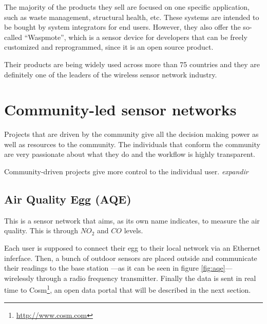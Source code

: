 The majority of the products they sell are focused on one specific application, such as waste management, structural health, etc. These systems are intended to be bought by system integrators for end users. However, they also offer the so-called ``Waspmote'', which is a sensor device for developers that can be freely customized and reprogrammed, since it is an open source product.

Their products are being widely used across more than 75 countries and they are definitely one of the leaders of the wireless sensor network industry.



\section{Community-led sensor networks}

Projects that are driven by the community give all the decision making power as well as resources to the community. The individuals that conform the community are very passionate about what they do and the workflow is highly transparent.

Community-driven projects give more control to the individual user. \emph{expandir}

\subsection{Air Quality Egg (AQE)}

This is a sensor network that aims, as its own name indicates, to measure the air quality. This is  through $NO_{2}$ and $CO$ levels.

Each user is supposed to connect their egg to their local network via an Ethernet inferface. Then, a bunch of outdoor sensors are placed outside and communicate their readings to the base station ---as it can be seen in figure \ref{fig:aqe}--- wirelessly through a radio frequency transmitter. Finally the data is sent in real time to Cosm\footnote{\url{http://www.cosm.com}}, an open data portal that will be described in the next section.


